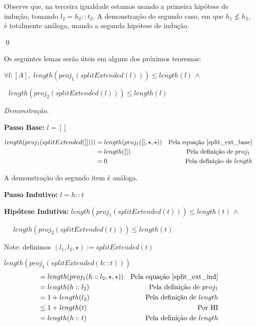 \documentclass[12pt, oneside, a4paper,english,brazil]{abntex2}
\begin{document}
Observe que, na terceira igualdade estamos usando a primeira hip\'otese de
indu\c{c}\~ao, tomando $l_{2} = h_{2} :: t_{2}$. A demonstra\c{c}\~ao do segundo caso, em que $h_{1} \not\le h_{2}$, \'e totalmente an\'aloga, usando a segunda hip\'otese de indu\c{c}\~ao.

\qed

Os seguintes lemas ser\~ao \'uteis em alguns dos pr\'oximos teoremas:

\begin{lema} \label{split_le}
  $\forall l : [A], \,\, length(proj_{1}(splitExtended(l))) \le length(l)\, \wedge$

  \qquad \qquad \qquad \qquad \,\, $length(proj_{2}(splitExtended(l))) \le length(l)$
\end{lema}

\noindent \textit{Demonstra\c{c}\~ao.}

\textbf{Passo Base: } $l = []$

\begin{align*}
  length(proj_{1}(splitExtended([]))) &= length(proj_{1}([], \star, \star)) &\text{Pela equa\c{c}\~ao \ref{split_ext_base}}\\
                                        &= length([]) &\text{Pela defini\c{c}\~ao de $proj_{1}$ }\\
  &= 0 &\text{Pela defini\c{c}\~ao de $length$}\\
\end{align*}

A demonstra\c{c}\~ao do segundo item \'e an\'aloga.

\textbf{Passo Indutivo: } $l = h :: t$

\textbf{Hip\'otese Indutiva: } $length(proj_{1}(splitExtended(t))) \le length(t)\, \wedge$

\qquad \qquad \qquad \qquad \quad \,\,\,\,\,\,  $length(proj_{2}(splitExtended(t))) \le length(t)$


Note: definimos $(l_{1}, l_{2}, \star) := splitExtended(t)$


$length(proj_{1}(splitExtended(h :: t)))$
\begin{align*}
  &= length(proj_{1}(h :: l_{2}, \star, \star)) &\text{Pela equa\c{c}\~ao \ref{split_ext_ind}} \\
  &= length(h :: l_{2}) &\text{Pela defini\c{c}\~ao de $proj_{1}$}\\
  &= 1 + length(l_{2}) &\text{Pela defini\c{c}\~ao de $length$}\\
  &\le 1 + length(t) &\text{Por HI}\\
  &= length(h :: t) &\text{Pela defini\c{c}\~ao de $length$}
\end{align*}
\end{document}
